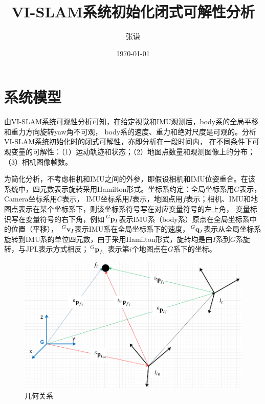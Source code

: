 \documentclass{article}
\title{VI-SLAM系统初始化闭式可解性分析}
\author{张谦}
\date{\today}
\begin{document}
\maketitle
\tableofcontents
\newpage

\section{系统模型}
由VI-SLAM系统可观性分析可知，在给定视觉和IMU观测后，body系的全局平移和重力方向旋转yaw角不可观，
body系的速度、重力和绝对尺度是可观的。分析VI-SLAM系统初始化时的闭式可解性，亦即分析在一段时间内，
在不同条件下可观变量的可解性：（1）运动轨迹和状态；（2）地图点数量和观测图像上的分布；（3）相机图像帧数。
\par
为简化分析，不考虑相机和IMU之间的外参，即假设相机和IMU位姿重合。在该系统中，四元数表示旋转采用Hamilton形式。坐标系约定：全局坐标系用$G$表示，Camera坐标系用$C$表示，
IMU坐标系用$I$表示，地图点用$f$表示；相机、IMU和地图点表示在某个坐标系下，则该坐标系符号写在对应变量符号的左上角，
变量标识写在变量符号的右下角，例如$\sideset{^G}{}{\mathop{\mathbf{p}_{I}}}$表示IMU系（body系）原点在全局坐标系中的位置（平移），
$\sideset{^G}{}{\mathop{\textbf{v}_{I}}}$表示IMU系在全局坐标系下的速度，$\sideset{^G}{}{\mathop{\textbf{q}_{I}}}$表示从全局坐标系
旋转到IMU系的单位四元数，由于采用Hamilton形式，旋转均是由$I$系到$G$系旋转，与JPL表示方式相反；$\sideset{^G}{}{\mathop{\textbf{p}_{f_i}}}$
表示第$i$个地图点在$G$系下的坐标。
\begin{figure}[ht]
    \centering
    \includegraphics[width=15cm]{figure1.png}
    \caption{几何关系}
    \label{figs:geometryRelation}
\end{figure}
\end{document}
